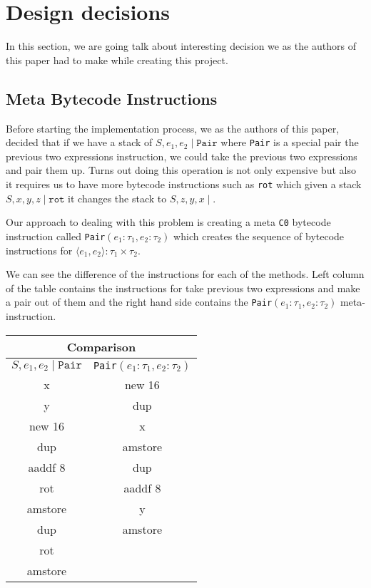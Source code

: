 \documentclass{acm_proc_article-sp}
\newcommand{\ccb}{\texttt{C0} bytecode }
\newcommand{\m}[1]{\texttt{#1}}
\begin{document}
\section{Design decisions}
In this section, we are going talk about interesting decision we as the authors of this paper had to make while creating this project.
\subsection{Meta Bytecode Instructions}
Before starting the implementation process, we as the authors of this paper, decided that if we have a stack of $S, e_1, e_2 \mid \m{Pair}$ where \m{Pair} is a special pair the previous two expressions instruction, we could take the previous two expressions and pair them up. Turns out doing this operation is not only expensive but also it requires us to have more bytecode instructions such as \m{rot} which given a stack $S, x, y, z \mid \m{rot}$ it changes the stack to $S, z, y, x \mid$.

Our approach to dealing with this problem is creating a meta \ccb instruction called \m{Pair}$(e_1 : \tau_1, e_2 : \tau_2)$ which creates the sequence of bytecode instructions for $\langle e_1, e_2\rangle : \tau_1 \times \tau_2$.

We can see the difference of the instructions for each of the methods. Left column of the table contains the instructions for take previous two expressions and make a pair out of them and the right hand side contains the \m{Pair}$(e_1 : \tau_1, e_2 : \tau_2)$ meta-instruction.

\begin{center}
{\ttfamily                           
\begin{tabular}{c | c}
\hline
\multicolumn{2}{c}{Comparison}             \\
\hline
$S, e_1, e_2 \mid \m{Pair}$    & \m{Pair}$(e_1 : \tau_1, e_2 : \tau_2)$ \\
\hline
x & new 16 \\
y & dup\\
new 16 & x\\
dup & amstore\\
aaddf 8 & dup\\
rot & aaddf 8\\
amstore & y\\
dup & amstore\\
rot & \\
amstore &\\
\hline
\end{tabular}
}
\end{center}
\end{document}
